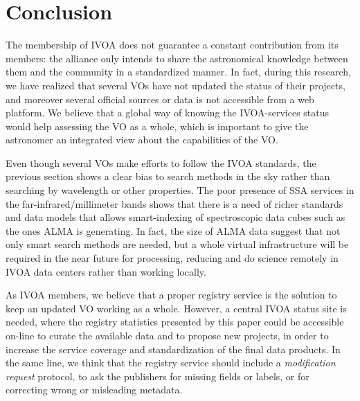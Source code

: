 \section{Conclusion}

The membership of IVOA does not
guarantee a constant contribution from its members: the alliance only 
intends to share the astronomical
knowledge between them and the community in a standardized manner. 
In fact, during this research, we have realized that several VOs have not 
updated the status of their projects, and moreover several official sources 
or data is not accessible from a web platform.
We believe that a global way of knowing the IVOA-services status would help 
assessing the VO as a whole, which is important to give the astronomer 
an integrated view about the capabilities of the VO.
 
Even though several VOs make efforts to follow the IVOA standards,
the previous section shows a clear bias to search methods in the
sky rather than searching by wavelength or other properties. 
The poor presence of SSA services in the far-infrared/millimeter
bands shows that there is a need of richer standards and data models
that allows smart-indexing of spectroscopic data cubes such as the ones ALMA is
generating. In fact, the size of ALMA data suggest that not only
smart search methods are needed, but a whole virtual infrastructure 
will be required in the near future for processing, reducing and do
science remotely in IVOA data centers rather than working locally.

As IVOA members, we believe that a proper registry service is the solution to
keep an updated VO working as a whole. However, a central IVOA status site is
needed, where the registry statistics presented by this paper could be
accessible on-line to curate the available data and to propose new projects, in
order to increase the service coverage and standardization of the final data
products. In the same line, we think that the registry service should include a
\emph{modification request} protocol, to ask the publishers for missing fields
or labels, or for correcting wrong or misleading metadata. 

